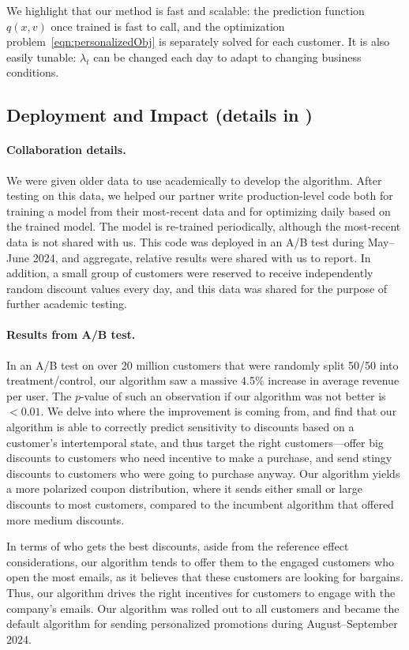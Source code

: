 \documentclass[format=acmsmall, review=false]{acmart}
\begin{document}
We highlight that our method is fast and scalable: the prediction function $q(x,v)$ once trained is fast to call, and the optimization problem~\eqref{eqn:personalizedObj} is separately solved for each customer.  It is also easily tunable: $\lambda_t$ can be changed each day to adapt to changing business conditions.

\subsection{Deployment and Impact (details in )} \label{sec:introDeploy}

\paragraph{Collaboration details.}
We were given older data to use academically to develop the algorithm.
After testing on this data, we helped our partner write production-level code both for training a model from their most-recent data and for optimizing daily based on the trained model.
The model is re-trained periodically, although the most-recent data is not shared with us.
This code was deployed in an A/B test during May--June 2024, and aggregate, relative results were shared with us to report.
In addition, a small group of customers were reserved to receive independently random discount values every day, and this data was shared for the purpose of further academic testing.

\paragraph{Results from A/B test.}
In an A/B test on over 20 million customers that were randomly split 50/50 into treatment/control, our algorithm saw a massive 4.5\% increase in average revenue per user.  The $p$-value of such an observation if our algorithm was not better is $<0.01$.
We delve into where the improvement is coming from, and find that our algorithm is able to correctly predict sensitivity to discounts based on a customer's intertemporal state, and thus target the right customers---offer big discounts to customers who need incentive to make a purchase, and send stingy discounts to customers who were going to purchase anyway.
Our algorithm yields a more polarized coupon distribution, where it sends either small or large discounts to most customers, compared to the incumbent algorithm that offered more medium discounts.

In terms of who gets the best discounts, aside from the reference effect considerations, our algorithm tends to offer them to the engaged customers who open the most emails, as it believes that these customers are looking for bargains.  Thus, our algorithm drives the right incentives for customers to engage with the company's emails.  Our algorithm was rolled out to all customers and became the default algorithm for sending personalized promotions during August--September 2024.
\end{document}
